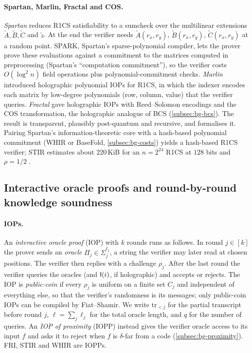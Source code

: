 \paragraph{Spartan, Marlin, Fractal and COS.} \emph{Spartan} \cite{Set20-Spartan} reduces R1CS
satisfiability to a sumcheck over the multilinear extensions $\tilde A,\tilde B,\tilde C$ and
$\tilde z$. At the end the verifier needs $\tilde A(r_x,r_y)$, $\tilde B(r_x,r_y)$,
$\tilde C(r_x,r_y)$ at a random point. SPARK, Spartan's sparse-polynomial compiler, lets the
prover prove these evaluations against a commitment to the matrices computed in preprocessing
(Spartan's ``computation commitment''), so the verifier costs $O(\log^2 n)$ field operations plus
polynomial-commitment checks. \emph{Marlin} \cite{CHMMVW20-Marlin} introduced holographic
polynomial IOPs for R1CS, in which the indexer encodes each matrix by low-degree polynomials
(row, column, value) that the verifier queries. \emph{Fractal} \cite{COS20} gave holographic IOPs
with Reed--Solomon encodings and the COS transformation, the holographic analogue of BCS
(\cref{subsec:bg-bcs}). The result is transparent, plausibly post-quantum and recursive, and
\cite[ch.~32]{CY24-Book} formalises it. Pairing Spartan's information-theoretic core with a
hash-based polynomial commitment (WHIR or BaseFold, \cref{subsec:bg-costs}) yields a
hash-based R1CS verifier; STIR estimates about $220$\,KiB for an $n=2^{24}$ R1CS at $128$ bits and
$\rho=1/2$ \cite{ACFY24-STIR}.

\subsection{Interactive oracle proofs and round-by-round knowledge soundness}\label{subsec:bg-iop}

\paragraph{IOPs.} An \emph{interactive oracle proof} (IOP)
\cite{BCS16,RRR16} with $k$ rounds runs as follows. In round $j\in[k]$ the prover sends an
\emph{oracle} $\Pi_j\in\Sigma_j^{\ell_j}$, a string the verifier may later read at chosen
positions. The verifier then replies with a challenge $\rho_j$. After the last round the
verifier queries the oracles (and $\mathsf{I}(i)$, if holographic) and accepts or rejects. The IOP is
\emph{public-coin} if every $\rho_j$ is uniform on a finite set $C_j$ and independent of
everything else, so that the verifier's randomness is its messages; only public-coin IOPs can be
compiled by Fiat--Shamir. We write $\mathrm{tr}_{<j}$ for the partial transcript before round $j$,
$\ell=\sum_j\ell_j$ for the total oracle length, and $q$ for the number of queries. An \emph{IOP of
proximity} (IOPP) instead gives the verifier oracle access to its input $f$ and asks it to reject
when $f$ is $\delta$-far from a code (\cref{subsec:bg-proximity}). FRI, STIR and WHIR are IOPPs.

